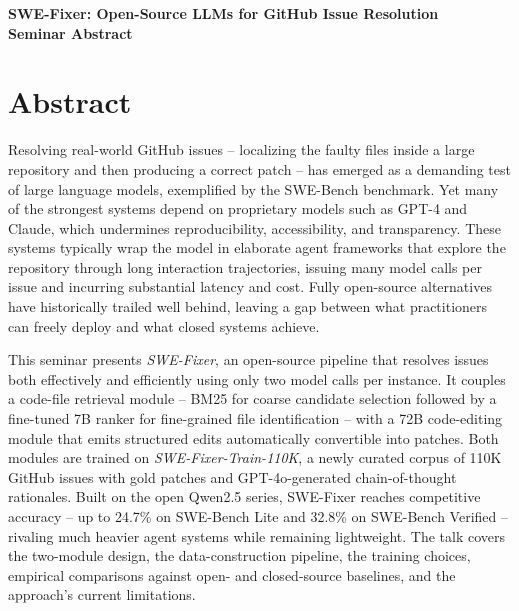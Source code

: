 \documentclass[11pt]{article}
\begin{document}
\begin{center}
{\LARGE\bfseries SWE-Fixer: Open-Source LLMs for GitHub Issue Resolution}\\[1.1em]
{\large\bfseries Seminar Abstract}\\[0.6em]
{\normalsize \seminarDate}
\end{center}
\vspace{0.6em}
\section*{Abstract}
Resolving real-world GitHub issues -- localizing the faulty files inside a large repository and then producing a correct patch -- has emerged as a demanding test of large language models, exemplified by the SWE-Bench benchmark. Yet many of the strongest systems depend on proprietary models such as GPT-4 and Claude, which undermines reproducibility, accessibility, and transparency. These systems typically wrap the model in elaborate agent frameworks that explore the repository through long interaction trajectories, issuing many model calls per issue and incurring substantial latency and cost. Fully open-source alternatives have historically trailed well behind, leaving a gap between what practitioners can freely deploy and what closed systems achieve.

This seminar presents \emph{SWE-Fixer}, an open-source pipeline that resolves issues both effectively and efficiently using only two model calls per instance. It couples a code-file retrieval module -- BM25 for coarse candidate selection followed by a fine-tuned 7B ranker for fine-grained file identification -- with a 72B code-editing module that emits structured edits automatically convertible into patches. Both modules are trained on \emph{SWE-Fixer-Train-110K}, a newly curated corpus of 110K GitHub issues with gold patches and GPT-4o-generated chain-of-thought rationales. Built on the open Qwen2.5 series, SWE-Fixer reaches competitive accuracy -- up to 24.7\% on SWE-Bench Lite and 32.8\% on SWE-Bench Verified -- rivaling much heavier agent systems while remaining lightweight. The talk covers the two-module design, the data-construction pipeline, the training choices, empirical comparisons against open- and closed-source baselines, and the approach's current limitations.
\end{document}

